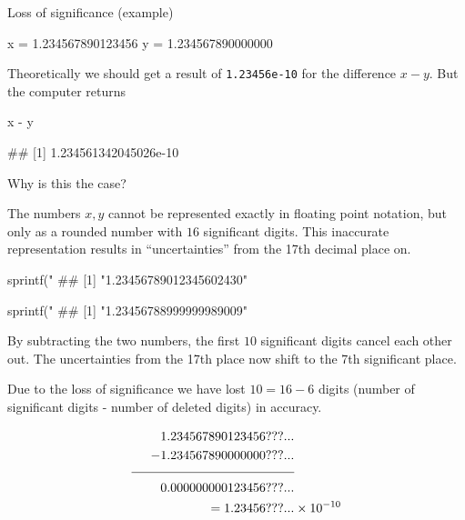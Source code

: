 \begin{vbframe}{Loss of significance (example)}

\footnotesize
\begin{verbbox}
x = 1.234567890123456
y = 1.234567890000000
\end{verbbox}
\col

\normalsize
\lz
Theoretically we should get a result of \texttt{1.23456e-10} for the difference $x - y$. But the computer returns
\lz
\footnotesize
\begin{verbbox}
x - y

## [1] 1.234561342045026e-10
\end{verbbox}
\col
\lz
\lz
\normalsize
Why is this the case?

\framebreak

The numbers $x, y$ cannot be represented exactly in floating point notation, but only as a rounded number with $16$ significant digits. This inaccurate representation results in \enquote{uncertainties} from the 17th decimal place on.

\lz
\lz
\footnotesize
\begin{verbbox}
sprintf("%
## [1] "1.23456789012345602430"
\end{verbbox}
\col

\vspace{0.1cm}
\begin{verbbox}
sprintf("%
## [1] "1.23456788999999989009"
\end{verbbox}
\col
\lz
\framebreak
\normalsize
By subtracting the two numbers, the first $10$ significant digits cancel each other out. The uncertainties from the 17th place now shift to the 7th significant place.

\lz

Due to the loss of significance we have lost $10 = 16 - 6$ digits (number of significant digits - number of deleted digits) in accuracy.
\vspace*{-0.5cm}

\begin{align*}
   1.234567890123456???... & \\
 - 1.234567890000000???... & \\[-1ex]
 \rule{4.5cm}{0.4pt} & \\
 0.000000000123456???... & \\
 = 1.23456???... & \times 10^{-10}
\end{align*}


\end{vbframe}


\endlecture

